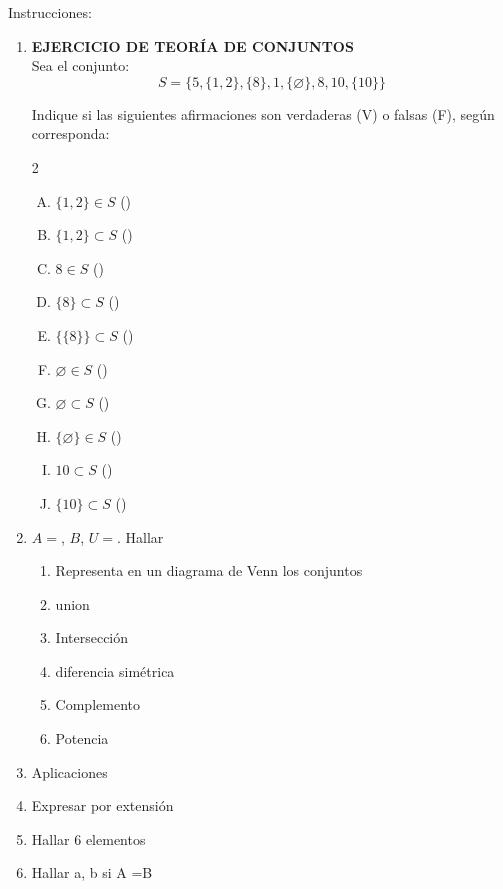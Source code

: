 \documentclass[12pt]{article}
\begin{document}
Instrucciones: 

\begin{enumerate}



\item \begin{flushleft}
    \textbf{EJERCICIO DE TEORÍA DE CONJUNTOS} \\
    \vspace{0.3cm}
    Sea el conjunto:
    \[ S = \{ 5, \{1, 2\}, \{8\}, 1, \{ \varnothing \}, 8, 10, \{10\} \} \]
    
    Indique si las siguientes afirmaciones son verdaderas (V) o falsas (F), según corresponda:
\end{flushleft}

\begin{multicols}{2}
\begin{enumerate}[A)]
    \item $\{1, 2\} \in S$ (\quad)
    \item $\{1, 2\} \subset S$  (\quad)
    \item $8 \in S$ (\quad)
    \item $\{8\} \subset S$  (\quad)
    \item $\{\{8\}\} \subset S$  (\quad)
    \item $\varnothing \in S$ (\quad)
    \item $\varnothing \subset S$ (\quad)
    \item $\{\varnothing\} \in S$  (\quad)
    \item $10 \subset S$ (\quad)
    \item $\{10\} \subset S$ (\quad)
\end{enumerate}
\end{multicols}
\item $A =$, $ B$, $ U = $. Hallar
\begin{enumerate}
\item Representa en un diagrama de Venn los conjuntos
\item union
\item Intersección
\item diferencia simétrica
\item Complemento
\item Potencia
\end{enumerate}
\item Aplicaciones
\item Expresar por extensión
\item Hallar 6 elementos
\item Hallar a, b si A =B

\end{enumerate}







   
\end{document}
